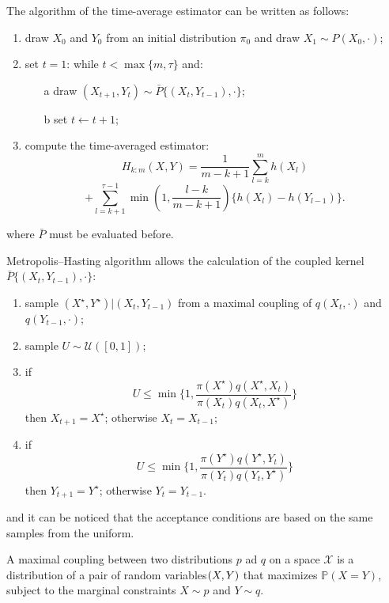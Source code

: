\documentclass {article}
\begin{document}
The algorithm of the time-average estimator can be written as follows:
\begin{enumerate}
	\item draw $X_0$ and $Y_0$ from an initial distribution $\pi_0$ and draw $X_1 \sim P(X_0, \cdot)$;
	\item set $t=1$: while $t<\max\{m,\tau\}$ and:
	\begin{itemize}
		\item[a] draw $(X_{t+1}, Y_t)\sim \bar P \{(X_t, Y_{t-1}), \cdot \}$; %
		\item[b] set $t \leftarrow t+1$;
	\end{itemize}
	\item compute the time-averaged estimator:	 	$$
		H_{k:m}(X,Y)
		= \frac{1}{m-k+1}\sum_{l=k}^{m}h(X_l) $$
		$$
		+ \sum_{l=k+1}^{\tau -1}\min(1, \frac{l-k}{m-k+1})\{h(X_l)-h(Y_{l-1})\} .
		$$
	
\end{enumerate}
where $ \bar P$ must be evaluated before.


	Metropolis--Hasting algorithm allows the calculation of the coupled kernel $\bar P \{(X_t, Y_{t-1}), \cdot \}$:
	
	\begin{enumerate}
		\item sample $(X^\star, Y^\star) | (X_t, Y_{t-1})$ from a maximal coupling of $q(X_t, \cdot)$ and $q(Y_{t-1}, \cdot)$;
		\item sample $U \sim \mathcal{U}([0,1])$;
		\item if
		$$ U
		\leq \min\bigg \{
		1,
		\frac{ \pi(X^\star)q(X^\star,X_t)}{
			\pi(X_t)q(X_t, X^\star)}
		\bigg \}
		$$
		then $X_{t+1} = X^\star$; otherwise $X_t = X_{t-1}$;
		\item if
		$$ U
		\leq \min\bigg \{ 
		1,
		\frac{ \pi(Y^\star)q(Y^\star,Y_t)}{
			\pi(Y_t)q(Y_t, Y^\star)}
		\bigg \}
		$$
		then $Y_{t+1} = Y^\star$; otherwise $Y_t = Y_{t-1}$.
		
	\end{enumerate}

and it can be noticed that the acceptance conditions are based on the same samples from the uniform.

A maximal coupling between two distributions $p$ ad $q$ on a space $\mathcal{X}$ is a distribution of a pair of random variables$(X, \space Y)$ that maximizes $\mathbb{P}(X=Y)$, subject to the marginal constraints $X\sim p$ and $Y \sim q$.
\end{document}
